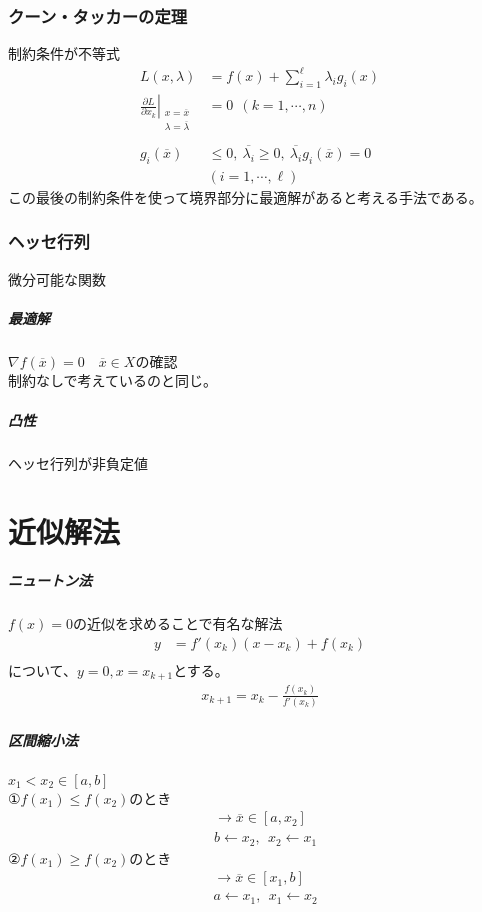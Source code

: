 \documentclass[twocolumn]{ltjsarticle}
\begin{document}
\subsubsection{クーン・タッカーの定理}\rightarrow 制約条件が不等式
\begin{align*}
    L(x,\lambda)&=f(x)+\sum_{i=1}^{\ell}\lambda_ig_i(x)\\
    \left. \frac{\partial L}{\partial x_k} \right|_{
        \begin{matrix}
            x=\overline{x}\\
            \lambda=\overline{\lambda}
        \end{matrix}
        }
    &=0\ \ (k=1,\cdots,n)\\\\
    g_i(\overline{x})&\leq0,\ \overline{\lambda_i}\geq0,\ 
    \overline{\lambda_i}g_i(\overline{x})=0\ \ \\
    &(i=1,\cdots,\ell)
\end{align*}
この最後の制約条件を使って境界部分に最適解があると考える手法である。
\subsubsection{ヘッセ行列}\rightarrow 微分可能な関数
\subparagraph{最適解}
$\nabla f(\overline{x})=0$\ \rightarrow \ $\overline{x}\in X$の確認
\\制約なしで考えているのと同じ。
\subparagraph{凸性}
ヘッセ行列が非負定値

\section{近似解法}
\subparagraph{ニュートン法}
$f(x)=0$の近似を求めることで有名な解法
\begin{align*}
    y&=f'(x_k)(x-x_k)+f(x_k)\\
\end{align*}
について、$y=0,x=x_{k+1}$とする。
\begin{align*}
    x_{k+1}=x_k-\frac{f(x_k)}{f'(x_k)}
\end{align*}
\subparagraph{区間縮小法}
$x_1<x_2\in[a,b]$\\
①$f(x_1)\leq f(x_2)$のとき
\begin{align*}
    &\rightarrow \overline{x}\in[a,x_2]\\
    &b\leftarrow x_2,\ \ x_2\leftarrow x_1
\end{align*}
②$f(x_1)\geq f(x_2)$のとき
\begin{align*}
    &\rightarrow \overline{x}\in[x_1,b]\\
    &a\leftarrow x_1,\ \ x_1\leftarrow x_2
\end{align*}
\end{document}
